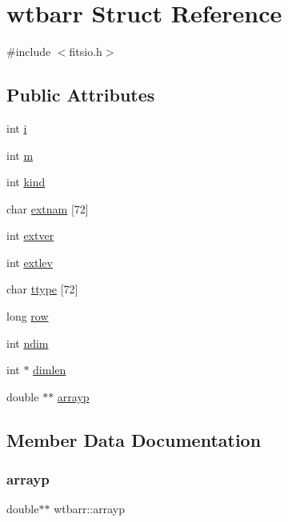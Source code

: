 \hypertarget{structwtbarr}{}\section{wtbarr Struct Reference}
\label{structwtbarr}


{\ttfamily \#include $<$fitsio.\+h$>$}

\subsection*{Public Attributes}
\begin{DoxyCompactItemize}
\item 
int \hyperlink{structwtbarr_a8743b84c99b4b5e7ab7bf0653507a180}{i}
\item 
int \hyperlink{structwtbarr_a1e88ad32570534a006e96cba721489b5}{m}
\item 
int \hyperlink{structwtbarr_af8ea7b15992ab7a86be63ff83318be41}{kind}
\item 
char \hyperlink{structwtbarr_a1ea437b35c85550b894e46ec2ff28982}{extnam} \mbox{[}72\mbox{]}
\item 
int \hyperlink{structwtbarr_a24487eda7b17800f41bd4a452c6306d5}{extver}
\item 
int \hyperlink{structwtbarr_a10c8dba85b62e2794071dd50a41c4bb1}{extlev}
\item 
char \hyperlink{structwtbarr_a2376a14a266e1cbe7b27e9f752784ec7}{ttype} \mbox{[}72\mbox{]}
\item 
long \hyperlink{structwtbarr_a2ff7c235353320c6dd98951484012ee7}{row}
\item 
int \hyperlink{structwtbarr_af862b4f90b0406ed8dd0c240768d4bd3}{ndim}
\item 
int $\ast$ \hyperlink{structwtbarr_a52de7766607c1260f13a90029edf7e73}{dimlen}
\item 
double $\ast$$\ast$ \hyperlink{structwtbarr_ad7d5ac0a7880f57ab1a95a959a1711ec}{arrayp}
\end{DoxyCompactItemize}


\subsection{Member Data Documentation}
\mbox{\label{structwtbarr_ad7d5ac0a7880f57ab1a95a959a1711ec}} 
\subsubsection{\texorpdfstring{arrayp}{arrayp}}
{\footnotesize\ttfamily double$\ast$$\ast$ wtbarr\+::arrayp}

